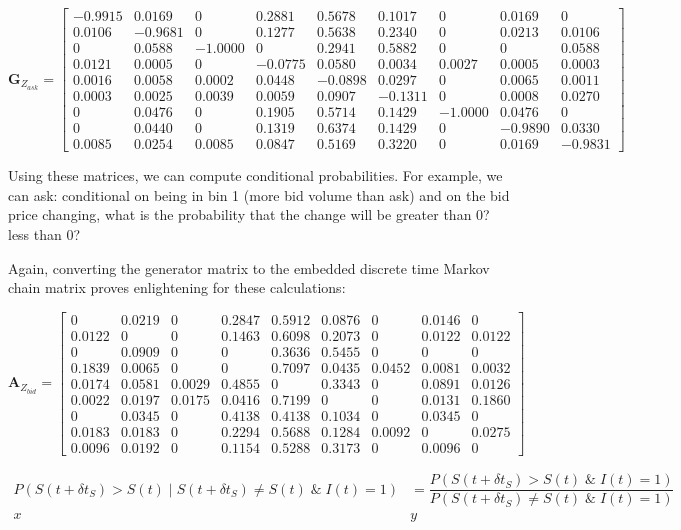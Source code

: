 \documentclass[12pt]{article}
\newcommand\mat[1]{\boldsymbol{#1}}
\begin{document}
$$\mat{G}_{Z_{ask}} =
\begin{bmatrix}
 -0.9915 &  0.0169 &  0 &  0.2881 &  0.5678 &  0.1017 &   0 &  0.0169 &  0 \\
 0.0106 & -0.9681 &  0 &  0.1277 &  0.5638 &  0.2340 &   0 &  0.0213 &  0.0106 \\
 0  &  0.0588 & -1.0000 &  0 &  0.2941 &  0.5882 &   0 &  0 &  0.0588 \\
 0.0121 &  0.0005 &  0 & -0.0775 &  0.0580 &  0.0034 &  0.0027 &  0.0005 &  0.0003 \\
 0.0016 &  0.0058 &  0.0002 &  0.0448 & -0.0898 &  0.0297 &   0 &  0.0065 &  0.0011 \\
 0.0003 &  0.0025 &  0.0039 &  0.0059 &  0.0907 & -0.1311 &   0 &  0.0008 &  0.0270 \\
 0 &  0.0476 &  0 &  0.1905 &  0.5714 &  0.1429 & -1.0000 &  0.0476 &   0 \\
 0 &  0.0440 &  0 &  0.1319 &  0.6374 &  0.1429 &   0 & -0.9890 &  0.0330 \\
 0.0085 &  0.0254 &  0.0085 &  0.0847 &  0.5169 &  0.3220 &   0 &  0.0169 & -0.9831

\end{bmatrix}$$

Using these matrices, we can compute conditional probabilities. For example, we can ask: conditional on being in bin 1 (more bid volume than ask) and on the bid price changing, what is the probability that the change will be greater than 0? less than 0?

Again, converting the generator matrix to the embedded discrete time Markov chain matrix proves enlightening for these calculations:

$$\mat{A}_{Z_{bid}} = 
\begin{bmatrix}
         0  &  0.0219 &        0 &   0.2847 &   0.5912 &   0.0876 &        0 &   0.0146 &        0\\
    0.0122  &       0 &        0 &   0.1463 &   0.6098 &   0.2073 &        0 &   0.0122 &   0.0122\\
         0  &  0.0909 &        0 &        0 &   0.3636 &   0.5455 &        0 &        0 &        0\\
    0.1839  &  0.0065 &        0 &        0 &   0.7097 &   0.0435 &   0.0452 &   0.0081 &   0.0032\\
    0.0174  &  0.0581 &   0.0029 &   0.4855 &        0 &   0.3343 &        0 &   0.0891 &   0.0126\\
    0.0022  &  0.0197 &   0.0175 &   0.0416 &   0.7199 &        0 &        0 &   0.0131 &   0.1860\\
         0  &  0.0345 &        0 &   0.4138 &   0.4138 &   0.1034 &        0 &   0.0345 &        0\\
    0.0183  &  0.0183 &        0 &   0.2294 &   0.5688 &   0.1284 &   0.0092 &        0 &   0.0275\\
    0.0096  &  0.0192 &        0 &   0.1154 &   0.5288 &   0.3173 &        0 &   0.0096 &        0
\end{bmatrix}$$

\begin{align*}
P(S(t+\delta t_S) > S(t) \; | \; S(t+\delta t_S) \neq S(t) \; \& \; I(t) = 1) 
&= \dfrac{ P(S(t+\delta t_S) > S(t) \; \& \; I(t) = 1)}{P(S(t+\delta t_S) \neq S(t) \; \& \; I(t) = 1)} \\
x & y
\end{align*}

\end{document}
